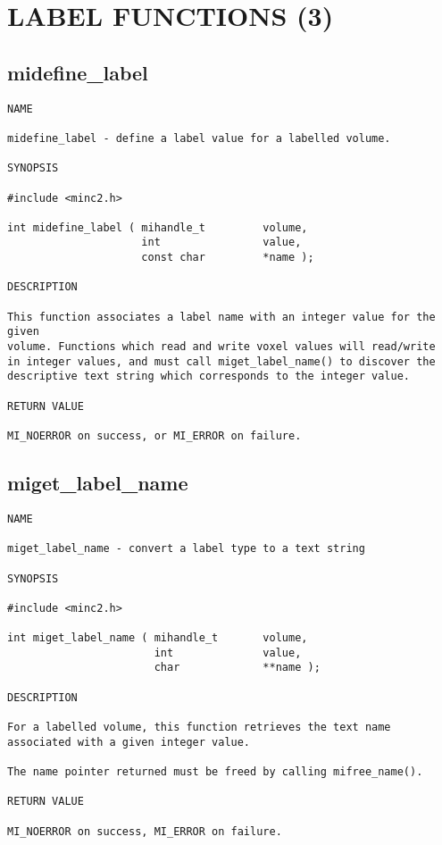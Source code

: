 \documentclass{article}
\begin{document}
\section{LABEL FUNCTIONS (3)}
\subsection{midefine\_label}
\begin{verbatim}
NAME

midefine_label - define a label value for a labelled volume.

SYNOPSIS

#include <minc2.h>

int midefine_label ( mihandle_t         volume, 
                     int                value, 
                     const char         *name );

DESCRIPTION

This function associates a label name with an integer value for the given
volume. Functions which read and write voxel values will read/write 
in integer values, and must call miget_label_name() to discover the 
descriptive text string which corresponds to the integer value.

RETURN VALUE

MI_NOERROR on success, or MI_ERROR on failure.
\end{verbatim}

\subsection{miget\_label\_name}
\begin{verbatim}
NAME

miget_label_name - convert a label type to a text string

SYNOPSIS

#include <minc2.h>

int miget_label_name ( mihandle_t       volume, 
                       int              value, 
                       char             **name );

DESCRIPTION

For a labelled volume, this function retrieves the text name
associated with a given integer value.

The name pointer returned must be freed by calling mifree_name().

RETURN VALUE

MI_NOERROR on success, MI_ERROR on failure.
\end{verbatim}
\end{document}
